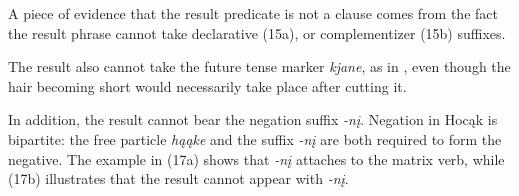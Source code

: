 \documentclass[output=paper]{LSP/langsci}
\begin{document}
A piece of evidence that the result predicate is not a clause comes from the fact the result phrase cannot take declarative (15a), or complementizer (15b) suffixes.

\begin{exe}
\ex\label{ex:rosen:15}
\begin{xlist}



\end{xlist}
\end{exe}

The result also cannot take the future tense marker \textit{kjane}, as in , even though the hair becoming short would necessarily take place after cutting it.

\begin{exe}


\end{exe}

In addition, the result cannot bear the negation suffix \textit{-nį}. Negation in Hocąk is bipartite: the free particle \textit{hąąke} and the suffix \textit{-nį} are both required to form the negative. The example in (17a) shows that \textit{-nį} attaches to the matrix verb, while (17b) illustrates that the result cannot appear with \textit{-nį}.
\end{document}
